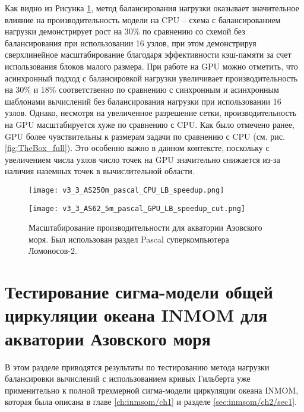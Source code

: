 Как видно из Рисунка \ref{fig:AzovSea}, метод балансирования нагрузки оказывает значительное влияние на производительность модели на CPU – схема с балансированием нагрузки демонстрирует рост на 30\% по сравнению со схемой без балансирования при использовании 16 узлов, при этом демонстрируя сверхлинейное масштабирование благодаря эффективности кэш-памяти за счет использования блоков малого размера.
При работе на GPU можно отметить, что асинхронный подход с балансировкой нагрузки увеличивает производительность на 30\% и 18\% соответственно по сравнению с синхронным и асинхронным шаблонами вычислений без балансирования нагрузки при использовании 16 узлов.
Однако, несмотря на увеличенное разрешение сетки, производительность на GPU масштабируется хуже по сравнению с CPU. Как было отмечено ранее, GPU более чувствительны к размерам задачи по сравнению с CPU (см. рис. \ref{fig:TheBox_full}).
Это особенно важно в данном контексте, поскольку с увеличением числа узлов число точек на GPU значительно снижается из-за наличия наземных точек в вычислительной области.

\begin{figure}[!ht]
	\begin{minipage}{0.5\linewidth}
	\centering
	\texttt{[image: v3\_3\_AS250m\_pascal\_CPU\_LB\_speedup.png]}
	\end{minipage}
	\begin{minipage}{0.5\linewidth}
	\centering
    \texttt{[image: v3\_3\_AS62\_5m\_pascal\_GPU\_LB\_speedup\_cut.png]}
	\end{minipage}
	\vspace{3pt}
	\caption{Масштабирование производительности для акватории Азовского моря. Был использован раздел Pascal суперкомпьютера Ломоносов-2.}
	\label{fig:AzovSea}
\end{figure}

\section{Тестирование сигма-модели общей циркуляции океана INMOM для акватории Азовского моря}\label{sec:inmsom/ch3/sec1}

В этом разделе приводятся результаты по тестированию метода нагрузки балансировки вычислений  с использованием кривых Гильберта уже применительно к полной трехмерной сигма-модели циркуляции океана INMOM, которая была описана в главе \ref{ch:inmsom/ch1} и разделе \ref{sec:inmsom/ch2/sec1}.
	
